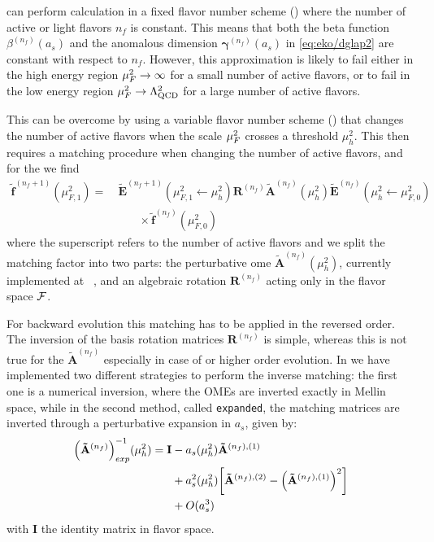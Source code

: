 \eko{} can perform calculation in a fixed flavor number scheme (\ffns{}) where
the number of active or light flavors $n_f$ is constant. This means that both
the beta function $\beta^{(n_f)}(a_s)$ and the anomalous dimension
$\bm{\gamma}^{(n_f)}(a_s)$ in \cref{eq:eko/dglap2} are constant with respect to
$n_f$.
However, this approximation is likely to fail either in the high energy region
$\mu_F^2 \to \infty$ for a small number of active flavors, or to fail in the low
energy region $\mu_F^2 \to \Lambda_{\text{QCD}}^2$ for a large number of active
flavors.

This can be overcome by using a variable flavor number scheme (\vfns{}) that
changes the number of active flavors when the scale $\mu_F^2$ crosses a
threshold $\mu_h^2$.
This then requires a matching procedure when changing the number of active
flavors, and for the \pdfs we find
\begin{align}
  \tilde{\mathbf{f}}^{(n_f+1)}(\mu_{F,1}^2)=&~ \tilde{\mathbf{E}}^{(n_f+1)}(\mu_{F,1}^2\leftarrow \mu_{h}^2) {\mathbf{R}^{(n_f)}} 
  \tilde{\mathbf{A}}^{(n_f)}(\mu_{h}^2) \tilde{\mathbf{E}}^{(n_f)}(\mu_{h}^2\leftarrow \mu_{F,0}^2)\nonumber\\
  &\qquad \times\tilde{\mathbf{f}}^{(n_f)}(\mu_{F,0}^2)
  \label{eq:eko/matching}
\end{align}
where the superscript refers to the number of active flavors and we split the
matching factor into two parts: the perturbative \acrfull{ome}
$\tilde{\mathbf{A}}^{(n_f)}(\mu_{h}^2)$, currently implemented at
\nnlo{}~\cite{Buza_1998}, and an algebraic rotation ${\mathbf{R}^{(n_f)}}$
acting only in the flavor space $\mathcal{F}$.

For backward evolution this matching has to be applied in the reversed order.
The inversion of the basis rotation matrices $\mathbf{R}^{(n_f)}$ is simple,
whereas this is not true for the \ome $\mathbf{\tilde A}^{(n_f)}$ especially
in case of \nnlo{} or higher order evolution.
In \eko{} we have implemented two different strategies to perform the inverse
matching: the first one is a numerical inversion, where the OMEs are inverted
exactly in Mellin space, while in the second method, called \texttt{expanded},
the matching matrices are inverted through a perturbative expansion in $a_s$,
given by:
\begin{align}
  \qty(\mathbf{\tilde A}^{(n_f)})_{exp}^{-1}(\mu_{h}^2) = \mathbf{I}
  &- a_s(\mu_{h}^2) \mathbf{\tilde A}^{(n_f),(1)} \nonumber\\
  &+ a_s^2(\mu_{h}^2) \qty[ \mathbf{\tilde A}^{(n_f),(2)} - \qty(\mathbf{\tilde A}^{(n_f),(1)})^2 ] \nonumber\\
  &+ O(a_s^3)
  \label{eq:eko/invmatchingexp}
\end{align}
with $\mathbf{I}$ the identity matrix in flavor space.
